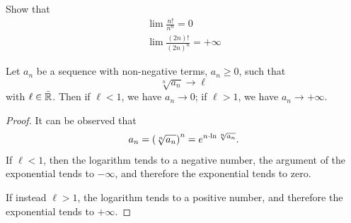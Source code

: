 \begin{exercise}
Show that
\begin{gather*}
  \lim \frac{n!}{n^n} = 0 \\
  \lim \frac{(2n)!}{(2n)^n} = +\infty
\end{gather*}
\end{exercise}

\begin{theorem}
\label{th:criterio_radice}%
\mymark{***}%
%
%
Let $a_n$ be a sequence with non-negative terms, $a_n\ge 0$, such that
\[
  \sqrt[n]{a_n} \to \ell
\]
with $\ell \in \bar {{\mathbb R}}$.
Then if $\ell<1$, we have $a_n \to 0$; if $\ell > 1$, we have $a_n \to +\infty$.
\end{theorem}
%

\begin{proof}
  It can be observed that
  \[
    a_n = {\left( \sqrt[n]{a_n} \right)}^n
     = e^{n \cdot \ln \sqrt[n]{a_n}}.
  \]
  If $\ell <1$, then the logarithm tends to a negative number,
    the argument of the exponential tends to $-\infty$, and therefore the
  exponential tends to zero.

    If instead $\ell>1$, the logarithm tends to a positive number, and therefore
  the exponential tends to $+\infty$.
\end{proof}

